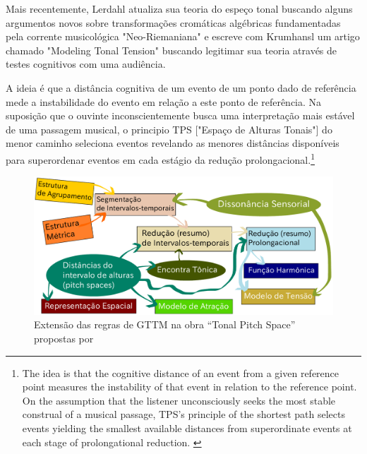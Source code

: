 \documentclass[
	12pt,				%
	openright,			%
	twoside,			%
	a4paper,			%
	english,			%
	french,				%
	spanish,			%
	brazil				%
	]{abntex2}
\begin{document}
\pagebreak
Mais recentemente, Lerdahl atualiza sua teoria do espeço tonal\cite{lerdahl2001tonal} buscando alguns argumentos novos sobre transformações cromáticas algébricas fundamentadas pela corrente musicológica "Neo-Riemaniana"\cite{cohn1998introduction,lewin2007generalized} e escreve com Krumhansl um artigo chamado "Modeling Tonal Tension"\cite{2007lerdahl-krumhansl} buscando legitimar sua teoria através de testes cognitivos com uma audiência.

\begin{citacao}
A ideia é que a distância cognitiva de um evento de um ponto dado de referência mede a instabilidade do evento em relação a este ponto de referência. Na suposição que o ouvinte inconscientemente busca uma interpretação mais estável de uma passagem musical, o principio TPS ["Espaço de Alturas Tonais"] do menor caminho seleciona eventos revelando as menores distâncias disponíveis para superordenar eventos em cada estágio da redução prolongacional.\cite[p. 191]{lerdahl2009genesis}\footnote{The idea is that the cognitive distance of an event from a given reference point measures the instability of that
event in relation to the reference point. On the assumption that the listener unconsciously seeks the most stable construal of a musical passage, TPS’s principle of
the shortest path selects events yielding the smallest available distances from superordinate events at each stage of prolongational reduction. \cite[p. 191]{lerdahl2009genesis}}
\end{citacao}

\begin{figure}[!h]
	\caption{\label{fig_grafico}Extensão das regras de GTTM na obra “Tonal Pitch Space” propostas por  }
	\begin{center}
	    \includegraphics[scale=0.5]{gttm/GTTM_TPS_rules.pdf}
	\end{center}
\end{figure}
\end{document}
